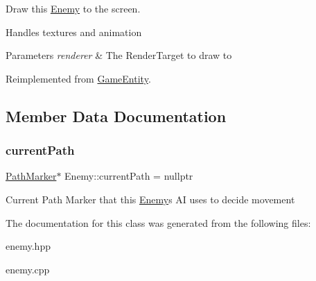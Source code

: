 Draw this \mbox{\hyperlink{class_enemy}{Enemy}} to the screen. 

Handles textures and animation


\begin{DoxyParams}{Parameters}
{\em renderer} & The Render\+Target to draw to \\
\hline
\end{DoxyParams}


Reimplemented from \mbox{\hyperlink{class_game_entity_ae8417c4fa668594827706c44091f7366}{Game\+Entity}}.



\subsection{Member Data Documentation}
\mbox{\label{class_enemy_a2ed2cdccc45d64b19b401029cd9ac063}} 
\subsubsection{\texorpdfstring{currentPath}{currentPath}}
{\footnotesize\ttfamily \mbox{\hyperlink{class_path_marker}{Path\+Marker}}$\ast$ Enemy\+::current\+Path = nullptr\hspace{0.3cm}{\ttfamily [protected]}}

Current Path Marker that this \mbox{\hyperlink{class_enemy}{Enemy}}\textquotesingle{}s AI uses to decide movement 

The documentation for this class was generated from the following files\+:\begin{DoxyCompactItemize}
\item 
enemy.\+hpp\item 
enemy.\+cpp\end{DoxyCompactItemize}

